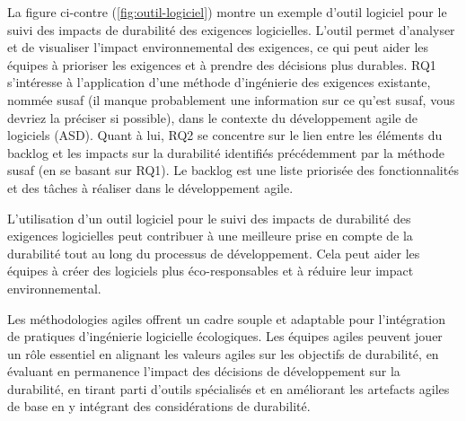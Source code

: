La figure ci-contre (\ref{fig:outil-logiciel}) montre un exemple d'outil logiciel pour le suivi des impacts de durabilité des exigences logicielles. L'outil permet d'analyser et de visualiser l'impact environnemental des exigences, ce qui peut aider les équipes à prioriser les exigences et à prendre des décisions plus durables. RQ1 s'intéresse à l'application d'une méthode d'ingénierie des exigences existante, nommée \acrshort{susaf} (il manque probablement une information sur ce qu'est \acrshort{susaf}, vous devriez la préciser si possible), dans le contexte du développement agile de logiciels (ASD). Quant à lui, RQ2 se concentre sur le lien entre les éléments du backlog et les impacts sur la durabilité identifiés précédemment par la méthode \acrshort{susaf} (en se basant sur RQ1). Le backlog est une liste priorisée des fonctionnalités et des tâches à réaliser dans le développement agile.

L'utilisation d'un outil logiciel pour le suivi des impacts de durabilité des exigences logicielles peut contribuer à une meilleure prise en compte de la durabilité tout au long du processus de développement. Cela peut aider les équipes à créer des logiciels plus éco-responsables et à réduire leur impact environnemental.

Les méthodologies agiles offrent un cadre souple et adaptable pour l'intégration de pratiques d'ingénierie logicielle écologiques. Les équipes agiles peuvent jouer un rôle essentiel en alignant les valeurs agiles sur les objectifs de durabilité, en évaluant en permanence l'impact des décisions de développement sur la durabilité, en tirant parti d'outils spécialisés et en améliorant les artefacts agiles de base en y intégrant des considérations de durabilité.



